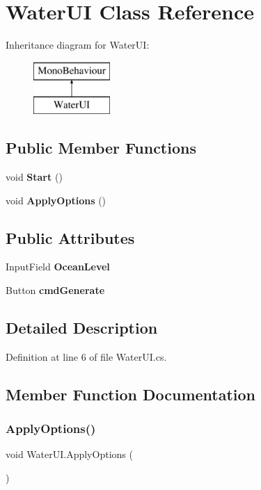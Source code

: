 \section{Water\+UI Class Reference}
\label{class_water_u_i}
Inheritance diagram for Water\+UI\+:\begin{figure}[H]
\begin{center}
\leavevmode
\includegraphics[height=2.000000cm]{class_water_u_i}
\end{center}
\end{figure}
\subsection*{Public Member Functions}
\begin{DoxyCompactItemize}
\item 
void \textbf{ Start} ()
\item 
void \textbf{ Apply\+Options} ()
\end{DoxyCompactItemize}
\subsection*{Public Attributes}
\begin{DoxyCompactItemize}
\item 
Input\+Field \textbf{ Ocean\+Level}
\item 
Button \textbf{ cmd\+Generate}
\end{DoxyCompactItemize}


\subsection{Detailed Description}


Definition at line 6 of file Water\+U\+I.\+cs.



\subsection{Member Function Documentation}
\mbox{\label{class_water_u_i_ad805905b761e49f2d5b329173900c3c0}} 
\subsubsection{Apply\+Options()}
{\footnotesize\ttfamily void Water\+U\+I.\+Apply\+Options (\begin{DoxyParamCaption}{ }\end{DoxyParamCaption})}



